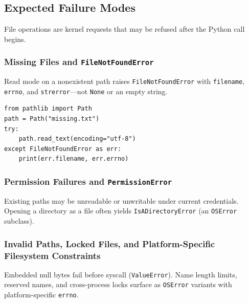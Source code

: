 \subsection{Expected Failure Modes}

File operations are kernel requests that may be refused after the Python call begins.

\subsubsection{Missing Files and \texttt{FileNotFoundError}}

Read mode on a nonexistent path raises \texttt{FileNotFoundError} with \texttt{filename}, \texttt{errno}, and \texttt{strerror}---not \texttt{None} or an empty string.

\begin{verbatim}
from pathlib import Path
path = Path("missing.txt")
try:
    path.read_text(encoding="utf-8")
except FileNotFoundError as err:
    print(err.filename, err.errno)
\end{verbatim}

\subsubsection{Permission Failures and \texttt{PermissionError}}

Existing paths may be unreadable or unwritable under current credentials. Opening a directory as a file often yields \texttt{IsADirectoryError} (an \texttt{OSError} subclass).

\subsubsection{Invalid Paths, Locked Files, and Platform-Specific Filesystem Constraints}

Embedded null bytes fail before syscall (\texttt{ValueError}). Name length limits, reserved names, and cross-process locks surface as \texttt{OSError} variants with platform-specific \texttt{errno}.
